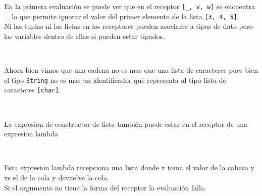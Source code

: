       En la primera evaluación se puede ver que en el receptor \texttt{[\_, v, w]} se encuentra \_ lo que permite ignorar el valor del primer elemento de la lista \texttt{[3, 4, 5]}.
      \\
      
      Ni las tuplas ni las listas en los receptores pueden asociarse a tipos de dato pero las variables dentro de ellas si pueden estar tipados.
      
      \begin{fxcode}
         \\
      \end{fxcode}
      
      Ahora bien vimos que una cadena no es mas que una lista de caracteres pues bien el tipo \texttt{String} no es mas un identificador que representa al tipo lista de caracteres \texttt{[char]}.
      
      
      \begin{fxcode}
         \\
      \end{fxcode}
      
      La expresion de constructor de lista también puede estar en el receptor de una expresion lambda
      
      \begin{fxcode}
         \\
      \end{fxcode}
      
      Esta expresion lambda recepciona una lista donde x toma el valor de la cabeza y xs el de la cola y devuelve la cola.
      \\
      
      Si el argumento no tiene la forma del receptor la evaluación falla.
      
      \begin{fxcode}
         \\
      \end{fxcode}
      
